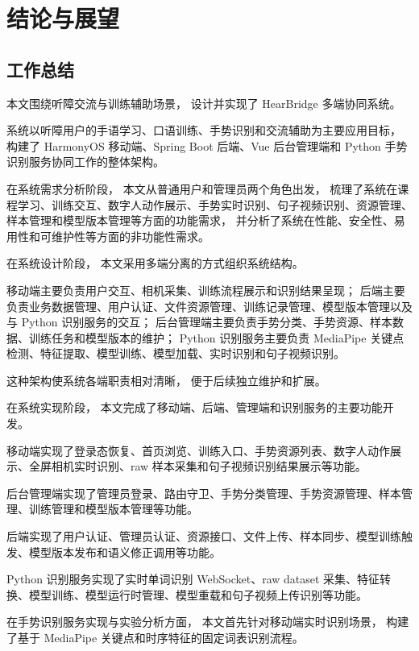 
\chapter{结论与展望}

\section{工作总结}

本文围绕听障交流与训练辅助场景，
设计并实现了 HearBridge 多端协同系统。

系统以听障用户的手语学习、口语训练、手势识别和交流辅助为主要应用目标，
构建了 HarmonyOS 移动端、Spring Boot 后端、Vue 后台管理端和 Python 手势识别服务协同工作的整体架构。

在系统需求分析阶段，
本文从普通用户和管理员两个角色出发，
梳理了系统在课程学习、训练交互、数字人动作展示、手势实时识别、句子视频识别、资源管理、样本管理和模型版本管理等方面的功能需求，
并分析了系统在性能、安全性、易用性和可维护性等方面的非功能性需求。

在系统设计阶段，
本文采用多端分离的方式组织系统结构。

移动端主要负责用户交互、相机采集、训练流程展示和识别结果呈现；
后端主要负责业务数据管理、用户认证、文件资源管理、训练记录管理、模型版本管理以及与 Python 识别服务的交互；
后台管理端主要负责手势分类、手势资源、样本数据、训练任务和模型版本的维护；
Python 识别服务主要负责 MediaPipe 关键点检测、特征提取、模型训练、模型加载、实时识别和句子视频识别。

这种架构使系统各端职责相对清晰，
便于后续独立维护和扩展。

在系统实现阶段，
本文完成了移动端、后端、管理端和识别服务的主要功能开发。

移动端实现了登录态恢复、首页浏览、训练入口、手势资源列表、数字人动作展示、全屏相机实时识别、raw 样本采集和句子视频识别结果展示等功能。

后台管理端实现了管理员登录、路由守卫、手势分类管理、手势资源管理、样本管理、训练管理和模型版本管理等功能。

后端实现了用户认证、管理员认证、资源接口、文件上传、样本同步、模型训练触发、模型版本发布和语义修正调用等功能。

Python 识别服务实现了实时单词识别 WebSocket、raw dataset 采集、特征转换、模型训练、模型运行时管理、模型重载和句子视频上传识别等功能。

在手势识别服务实现与实验分析方面，
本文首先针对移动端实时识别场景，
构建了基于 MediaPipe 关键点和时序特征的固定词表识别流程。

